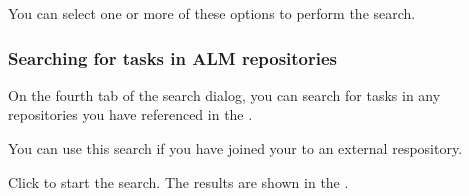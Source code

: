 You can select one or more of these options to perform the search. 

\subsubsection{Searching for tasks in ALM repositories}
\label{TasksSearchTasks}

On the fourth tab of the search dialog, you can search for tasks in any repositories you have referenced in the \gdproject{}.

You can use this search if you have joined your \gdproject{} to an external respository.

Click  to start the search. The results are shown in the \gdsearchresultview{} . 
